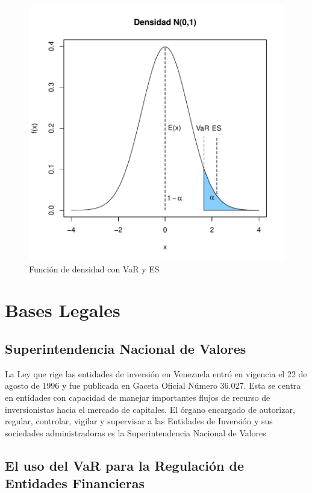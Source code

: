 \documentclass[a4paper,12pt]{Latex/Classes/PhDthesisPSnPDF}
\begin{document}
\begin{figure}[H]
\centering
\includegraphics{main-001}
\caption{Función de densidad con VaR y ES}
\end{figure}

\section{Bases Legales}

\subsection{Superintendencia Nacional de Valores}

La Ley que rige las entidades de inversión en Venezuela  entró en vigencia el 22 de agosto de 1996 y fue publicada en Gaceta Oficial Número 36.027. Esta se centra en entidades con capacidad de manejar importantes flujos de recurso de inversionistas hacia el mercado de capitales. El órgano encargado de autorizar, regular, controlar, vigilar y supervisar a las Entidades de Inversión y sus sociedades administradoras es la Superintendencia Nacional de Valores

\subsection{El uso del VaR para la Regulación de Entidades Financieras}
\end{document}
